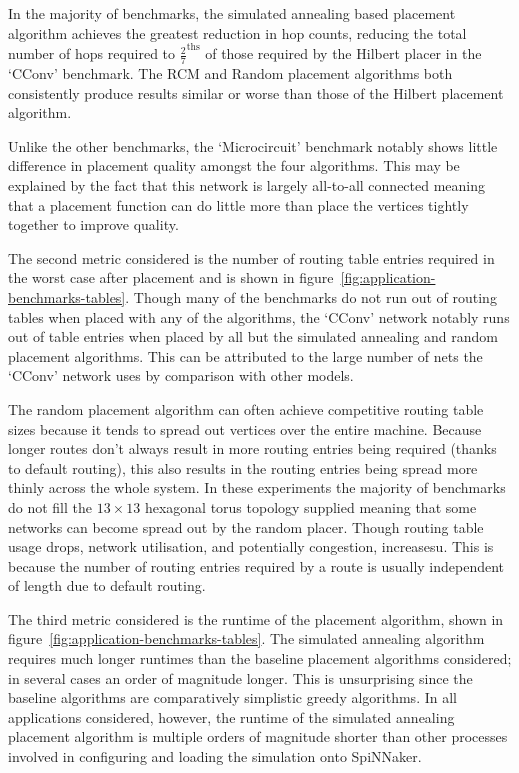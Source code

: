 				In the majority of benchmarks, the simulated annealing based placement
				algorithm achieves the greatest reduction in hop counts, reducing the
				total number of hops required to $\frac{2}{7}^\textrm{ths}$ of those
				required by the Hilbert placer in the `CConv' benchmark. The RCM and
				Random placement algorithms both consistently produce results similar
				or worse than those of the Hilbert placement algorithm.
				
				Unlike the other benchmarks, the `Microcircuit' benchmark notably shows
				little difference in placement quality amongst the four algorithms.
				This may be explained by the fact that this network is largely
				all-to-all connected meaning that a placement function can do little
				more than place the vertices tightly together to improve quality.
				
				The second metric considered is the number of routing table entries
				required in the worst case after placement and is shown in
				figure~\ref{fig:application-benchmarks-tables}. Though many of the
				benchmarks do not run out of routing tables when placed with any of the
				algorithms, the `CConv' network notably runs out of table entries when
				placed by all but the simulated annealing and random placement
				algorithms. This can be attributed to the large number of nets the
				`CConv' network uses by comparison with other models.
				
				The random placement algorithm can often achieve competitive routing
				table sizes because it tends to spread out vertices over the entire
				machine. Because longer routes don't always result in more routing
				entries being required (thanks to default routing), this also results
				in the routing entries being spread more thinly across the whole
				system. In these experiments the majority of benchmarks do not fill the
				$13\times13$ hexagonal torus topology supplied meaning that some
				networks can become spread out by the random placer. Though routing
				table usage drops, network utilisation, and potentially congestion,
				increasesu. This is because the number of routing entries required by a
				route is usually independent of length due to default routing.
				
				The third metric considered is the runtime of the placement algorithm,
				shown in figure~\ref{fig:application-benchmarks-tables}. The simulated
				annealing algorithm requires much longer runtimes than the baseline
				placement algorithms considered; in several cases an order of magnitude
				longer. This is unsurprising since the baseline algorithms are
				comparatively simplistic greedy algorithms. In all applications
				considered, however, the runtime of the simulated annealing placement
				algorithm is multiple orders of magnitude shorter than other processes
				involved in configuring and loading the simulation onto SpiNNaker.
				
